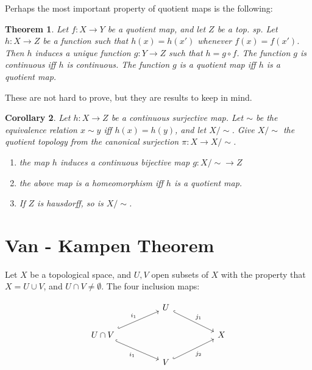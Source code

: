 \documentclass[10pt, openany]{book}
\theoremstyle{plain}
\newtheorem{theorem}{Theorem}[section]
\newtheorem{corollary}[theorem]{Corollary}
\theoremstyle{definition}
\theoremstyle{remark}
\begin{document}
Perhaps the most important property of quotient maps is the following:
\begin{theorem}
    Let $f:X\rightarrow Y$ be a quotient map, and let $Z$ be a top. sp. Let $h : X\rightarrow Z$ be a function such that $h(x) = h(x')$ whenever $f(x) = f(x')$. Then $h$ induces a unique function $g: Y\rightarrow Z$ such that $h = g\circ f$. The function $g$ is continuous iff $h$ is continuous. The function $g$ is a quotient map iff $h$ is a quotient map.
\end{theorem}
These are not hard to prove, but they are results to keep in mind.

\begin{corollary}
    Let $h : X\rightarrow Z$ be a continuous surjective map. Let $\sim$ be the equivalence relation $x\sim y$ iff $h(x) = h(y)$, and let $X/\sim$. Give $X/\sim$ the quotient topology from the canonical surjection $\pi: X \rightarrow X/\sim$.
    \begin{enumerate}
    \item the map $h$ induces a continuous bijective map $g : X/\sim \rightarrow Z$
    \item the above map is a homeomorphism iff $h$ is a quotient map.
    \item If $Z$ is hausdorff, so is $X/\sim$.
\end{enumerate}
\end{corollary}


\section{Van - Kampen Theorem}
Let $X$ be a topological space, and $U,V$ open subsets of $X$ with the property that $X = U\cup V$, and $U\cap V\neq\emptyset$.
The four inclusion maps:

\[\begin{tikzcd}
	&& U && \\
	{U\cap V} &&&& X \\
	&& V
	\arrow["{j_1}", hook, from=1-3, to=2-5]
	\arrow["{i_1}", hook, from=2-1, to=1-3]
	\arrow["{i_1}"', hook, from=2-1, to=3-3]
	\arrow["{j_2}"', hook, from=3-3, to=2-5]
\end{tikzcd}\]
\end{document}
